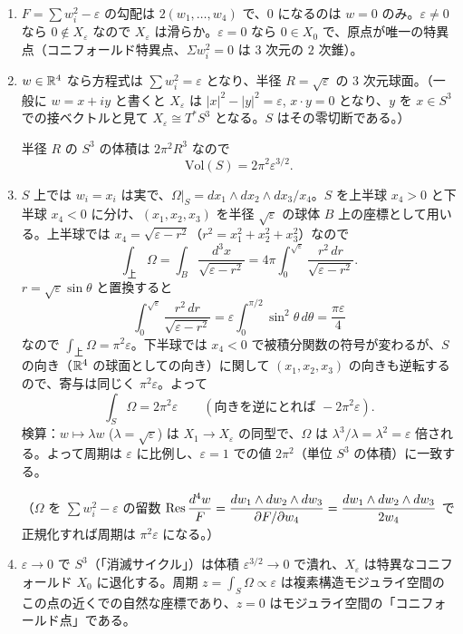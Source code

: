 \begin{enumerate}
  \item $F=\sum w_i^2-\varepsilon$ の勾配は $2(w_1,\dots,w_4)$ で、$0$ になるのは $w=0$ のみ。$\varepsilon\neq0$ なら $0\notin X_\varepsilon$ なので $X_\varepsilon$ は滑らか。$\varepsilon=0$ なら $0\in X_0$ で、原点が唯一の特異点（コニフォールド特異点、$\Sigma w_i^2=0$ は $3$ 次元の $2$ 次錐）。
  \item $w\in\mathbb{R}^4$ なら方程式は $\sum w_i^2=\varepsilon$ となり、半径 $R=\sqrt\varepsilon$ の $3$ 次元球面。（一般に $w=x+iy$ と書くと $X_\varepsilon$ は $|x|^2-|y|^2=\varepsilon$, $x\cdot y=0$ となり、$y$ を $x\in S^3$ での接ベクトルと見て $X_\varepsilon\cong T^*S^3$ となる。$S$ はその零切断である。）

  半径 $R$ の $S^3$ の体積は $2\pi^2R^3$ なので
  \[
    \mathrm{Vol}(S)=2\pi^2\varepsilon^{3/2}.
  \]
  \item $S$ 上では $w_i=x_i$ は実で、$\Omega|_S=dx_1\wedge dx_2\wedge dx_3/x_4$。$S$ を上半球 $x_4>0$ と下半球 $x_4<0$ に分け、$(x_1,x_2,x_3)$ を半径 $\sqrt\varepsilon$ の球体 $B$ 上の座標として用いる。上半球では $x_4=\sqrt{\varepsilon-r^2}$（$r^2=x_1^2+x_2^2+x_3^2$）なので
  \[
    \int_{\text{上}}\Omega=\int_B\frac{d^3x}{\sqrt{\varepsilon-r^2}}=4\pi\int_0^{\sqrt\varepsilon}\frac{r^2\,dr}{\sqrt{\varepsilon-r^2}}.
  \]
  $r=\sqrt\varepsilon\sin\theta$ と置換すると
  \[
    \int_0^{\sqrt\varepsilon}\frac{r^2\,dr}{\sqrt{\varepsilon-r^2}}=\varepsilon\int_0^{\pi/2}\sin^2\theta\,d\theta=\frac{\pi\varepsilon}{4}
  \]
  なので $\int_{\text{上}}\Omega=\pi^2\varepsilon$。下半球では $x_4<0$ で被積分関数の符号が変わるが、$S$ の向き（$\mathbb{R}^4$ の球面としての向き）に関して $(x_1,x_2,x_3)$ の向きも逆転するので、寄与は同じく $\pi^2\varepsilon$。よって
  \[
    \int_S\Omega=2\pi^2\varepsilon\qquad(\text{向きを逆にとれば }-2\pi^2\varepsilon).
  \]
  検算：$w\mapsto\lambda w$ ($\lambda=\sqrt\varepsilon$) は $X_1\to X_\varepsilon$ の同型で、$\Omega$ は $\lambda^3/\lambda=\lambda^2=\varepsilon$ 倍される。よって周期は $\varepsilon$ に比例し、$\varepsilon=1$ での値 $2\pi^2$（単位 $S^3$ の体積）に一致する。

  （$\Omega$ を $\sum w_i^2-\varepsilon$ の留数 $\operatorname{Res}\dfrac{d^4w}{F}=\dfrac{dw_1\wedge dw_2\wedge dw_3}{\partial F/\partial w_4}=\dfrac{dw_1\wedge dw_2\wedge dw_3}{2w_4}$ で正規化すれば周期は $\pi^2\varepsilon$ になる。）
  \item $\varepsilon\to0$ で $S^3$（「消滅サイクル」）は体積 $\varepsilon^{3/2}\to0$ で潰れ、$X_\varepsilon$ は特異なコニフォールド $X_0$ に退化する。周期 $z=\int_S\Omega\propto\varepsilon$ は複素構造モジュライ空間のこの点の近くでの自然な座標であり、$z=0$ はモジュライ空間の「コニフォールド点」である。


\end{enumerate}
